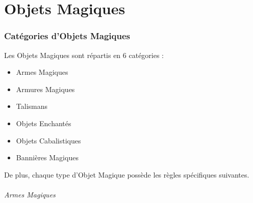 
\newcommand{\backlashscroll}{Parchemin de Retour de Flamme}
\newcommand{\bookofarcanepower}{Grimoire de Puissance Cabalistique}
\newcommand{\essenceofafreemind}{Essence de Libre Pensée}
\newcommand{\dispelscroll}{Parchemin de Dissipation}
\newcommand{\tomeofarcanelore}{Grimoire de Connaissance Mystique}
\newcommand{\groundingrod}{Baguette Tellurique}
\newcommand{\sceptreofpower}{Sceptre de Pouvoir}
\newcommand{\bindingscroll}{Parchemin d'Entrave}
\newcommand{\shieldingscroll}{Parchemin de Protection}
\newcommand{\wandofstability}{Baguette de Stabilité}


\newcommand{\rendingbanner}{Bannière de Rasoirs}
\newcommand{\stalkersstandard}{Étendard du Pisteur}
\newcommand{\aethericon}{Icône d'Æther}
\newcommand{\holyicon}{Icône Sacrée}
\newcommand{\bannerofdiscipline}{Bannière de Discipline}
\newcommand{\bannerofspeed}{Bannière de Vitesse}
\newcommand{\flamingstandard}{Étendard Flamboyant}
\newcommand{\warstandard}{Étendard de Guerre}
\newcommand{\iconoftherelentlesscompany}{Icône de la Compagnie Implacable}
\newcommand{\gleamingicon}{Icône Étincelante}
\newcommand{\bannerofcourage}{Bannière de Courage}



\part{Objets Magiques}

\section{Catégories d'Objets Magiques}

Les Objets Magiques sont répartis en 6 catégories :
\begin{itemize}[label={\textbullet}]
\item Armes Magiques
\item Armures Magiques
\item Talismans
\item Objets Enchantés
\item Objets Cabalistiques
\item Bannières Magiques
\end{itemize}

De plus, chaque type d'Objet Magique possède les règles spécifiques suivantes.

\paragraph{Armes Magiques}

